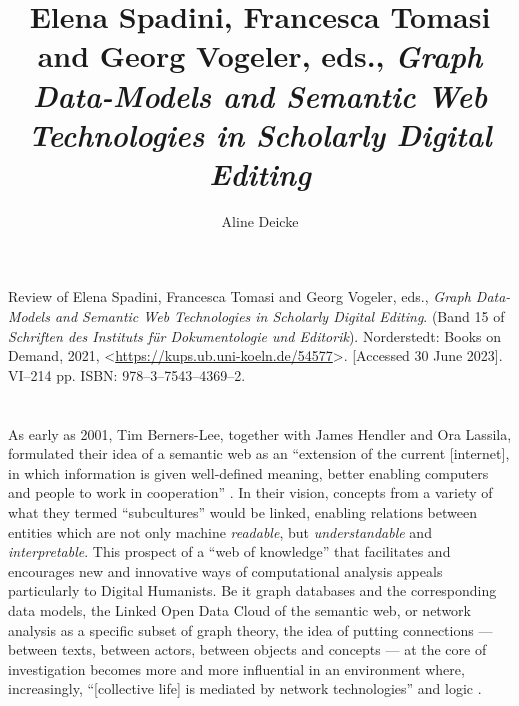 \documentclass{article}
\author{Aline Deicke}
\title{Elena Spadini, Francesca Tomasi and Georg Vogeler, eds., \emph{Graph Data-Models and Semantic Web Technologies in Scholarly Digital Editing}}
\begin{document}
\maketitle



\begin{reviewed}
  Review of Elena Spadini, Francesca Tomasi and Georg Vogeler, eds., \emph{Graph Data-Models and Semantic Web Technologies in Scholarly Digital Editing}. (Band 15 of \textit{Schriften des Instituts für Dokumentologie und Editorik}). Norderstedt: Books on Demand, 2021, <\href{https://kups.ub.uni-koeln.de/54577}{https://kups.ub.uni-koeln.de/54577}>. [Accessed 30 June 2023]. VI–214 pp. ISBN: 978–3–7543–4369–2.
  \end{reviewed}
  
  

\section*{} 
As early as 2001, Tim Berners-Lee, together with James Hendler and Ora
Lassila, formulated their idea of a semantic web as an ``extension of the
current {[}internet{]}, in which information is given well-defined
meaning, better enabling computers and people to work in cooperation'' \parencite{berners-lee_semantic_2001}. In their vision, concepts from a variety of
what they termed ``subcultures'' would be linked, enabling relations
between entities which are not only machine \emph{readable}, but
\emph{understandable} and \emph{interpretable}. This prospect of a ``web
of knowledge'' that facilitates and encourages new and innovative ways
of computational analysis appeals particularly to Digital Humanists. Be
it graph databases and the corresponding data models, the Linked Open
Data Cloud of the semantic web, or network analysis as a specific subset
of graph theory, the idea of putting connections --- between texts,
between actors, between objects and concepts --- at the core of
investigation becomes more and more influential in an environment where,
increasingly, ``{[}collective life{]} is mediated by network
technologies'' and logic \parencite[513]{venturini_actor-network_2019}.
\end{document}
